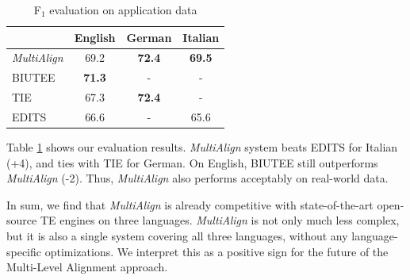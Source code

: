 \documentclass[11pt,a4paper]{article}
\begin{document}

\begin{table}[t!]
\centering
\begin{tabular}{l|ccc}
              &   English         &   German        &  Italian  \\
\hline
{\em MultiAlign}&   69.2          &  \textbf{72.4}  &  \textbf{69.5}   \\
BIUTEE          &   \textbf{71.3} &     -           &     -            \\
TIE             &     67.3        &  \textbf{72.4}  &     -            \\ 
EDITS           &     66.6        &     -           &    65.6          \\

\end{tabular}
\caption{F$_1$ evaluation on application data}
\label{table:egraph}
\end{table}

Table \ref{table:egraph} shows our evaluation results.
{\it MultiAlign} system beats EDITS for Italian (+4), and ties
with TIE for German. On English, BIUTEE still outperforms {\it
  MultiAlign} (-2). Thus, {\it MultiAlign} also performs acceptably 
on real-world data. 

In sum, we find that {\it MultiAlign} is already competitive with
state-of-the-art open-source TE engines on three languages.  
{\it MultiAlign} is not only much less complex, but it is also a single
system covering all three languages, without any language-specific
optimizations. We interpret this as a positive sign for the future of
the Multi-Level Alignment approach.
\end{document}
